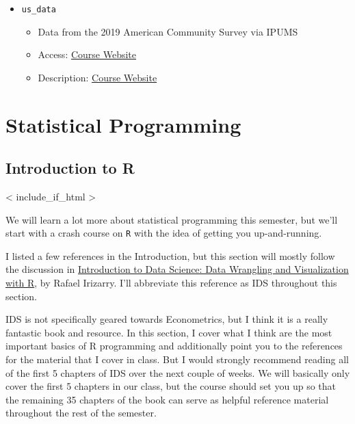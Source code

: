 \documentclass[
  letterpaper,
  DIV=11,
  numbers=noendperiod]{scrreprt}
\begin{document}
\begin{itemize}
  \begin{itemize}
  \item
    Out of sample version of \texttt{titanic\_training} data
  \item
    Access: \href{\%60r\%20course_website_link\%60}{Course Website}
  \item
    Description: \href{https://www.kaggle.com/c/titanic/data}{Kaggle}
  \end{itemize}
\item
  \texttt{us\_data}

  \begin{itemize}
  \item
    Data from the 2019 American Community Survey via IPUMS
  \item
    Access: \href{\%60r\%20course_website_link\%60}{Course Website}
  \item
    Description: \href{\%60r\%20course_website_link\%60}{Course Website}
  \end{itemize}
\end{itemize}

\part{Statistical Programming}


\chapter{Introduction to R}\label{introduction-to-r}

{{< include_if_html >}}

We will learn a lot more about statistical programming this semester,
but we'll start with a crash course on \texttt{R} with the idea of
getting you up-and-running.

I listed a few references in the Introduction, but this section will
mostly follow the discussion in
\href{https://rafalab.dfci.harvard.edu/dsbook-part-1/}{Introduction to
Data Science: Data Wrangling and Visualization with R}, by Rafael
Irizarry. I'll abbreviate this reference as IDS throughout this section.

IDS is not specifically geared towards Econometrics, but I think it is a
really fantastic book and resource. In this section, I cover what I
think are the most important basics of R programming and additionally
point you to the references for the material that I cover in class. But
I would strongly recommend reading all of the first 5 chapters of IDS
over the next couple of weeks. We will basically only cover the first 5
chapters in our class, but the course should set you up so that the
remaining 35 chapters of the book can serve as helpful reference
material throughout the rest of the semester.
\end{document}
